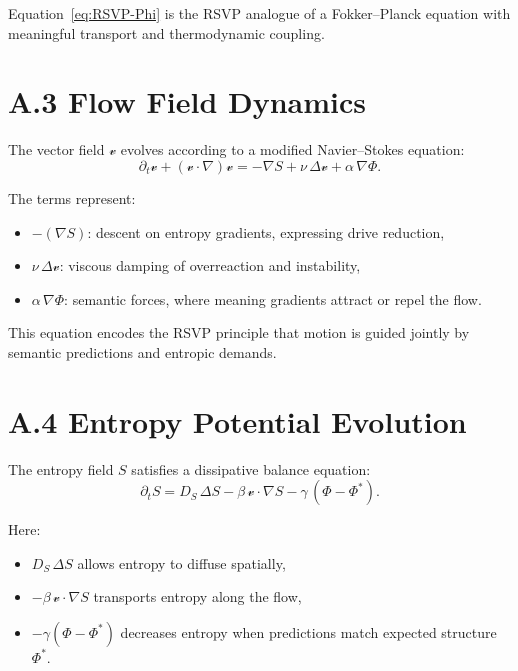 Equation~\eqref{eq:RSVP-Phi} is the RSVP analogue of a Fokker--Planck equation
with meaningful transport and thermodynamic coupling.

\section*{A.3 \; Flow Field Dynamics}

The vector field $\mathcal{v}$ evolves according to a modified Navier--Stokes
equation:
\begin{equation}
\label{eq:RSVP-v}
\partial_t \mathcal{v}
  + (\mathcal{v}\!\cdot\nabla)\mathcal{v}
    = -\nabla S
      + \nu\,\Delta\mathcal{v}
      + \alpha\,\nabla\Phi.
\end{equation}

The terms represent:
\begin{itemize}
  \item $-(\nabla S)$: descent on entropy gradients, expressing drive reduction,
  \item $\nu\,\Delta\mathcal{v}$: viscous damping of overreaction and instability,
  \item $\alpha\,\nabla\Phi$: semantic forces, where meaning gradients attract or
        repel the flow.
\end{itemize}

This equation encodes the RSVP principle that motion is guided jointly by
semantic predictions and entropic demands.

\section*{A.4 \; Entropy Potential Evolution}

The entropy field $S$ satisfies a dissipative balance equation:
\begin{equation}
\label{eq:RSVP-S}
\partial_t S
  = D_S\,\Delta S
    - \beta\,\mathcal{v}\!\cdot\nabla S
    - \gamma\,(\Phi - \Phi^\ast).
\end{equation}

Here:
\begin{itemize}
  \item $D_S\,\Delta S$ allows entropy to diffuse spatially,
  \item $-\beta\,\mathcal{v}\!\cdot\nabla S$ transports entropy along the flow,
  \item $-\gamma(\Phi - \Phi^\ast)$ decreases entropy when predictions match
        expected structure $\Phi^\ast$.
\end{itemize}

